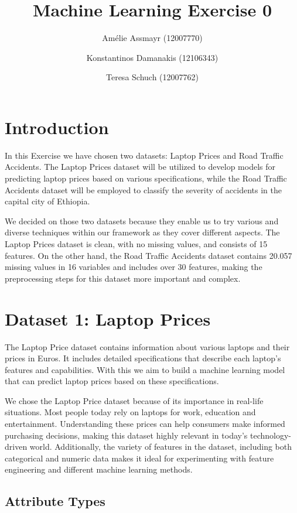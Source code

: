 \documentclass{article}
\title{Machine Learning Exercise 0}
\author{Amélie Assmayr (12007770) \and
        Konstantinos Damanakis (12106343) \and
        Teresa Schuch (12007762)}
\begin{document}
\maketitle

\section{Introduction}

In this Exercise we have chosen two datasets: Laptop Prices and Road Traffic Accidents. The Laptop Prices dataset will be utilized to develop models for predicting laptop prices based on various specifications, while the Road Traffic Accidents dataset will be employed to classify the severity of accidents in the capital city of Ethiopia. \newline

We decided on those two datasets because they enable us to try various and diverse techniques within our framework as they cover different aspects. The Laptop Prices dataset is clean, with no missing values, and consists of 15 features. On the other hand, the Road Traffic Accidents dataset contains 20.057 missing values in 16 variables and includes over 30 features, making the preprocessing steps for this dataset more important and complex.

\section{Dataset 1: Laptop Prices}

The Laptop Price dataset contains information about various laptops and their prices in Euros. It includes detailed specifications that describe each laptop's features and capabilities. With this we aim to build a machine learning model that can predict laptop prices based on these specifications. \newline

We chose the Laptop Price dataset because of its importance in real-life situations. Most people today rely on laptops for work, education and entertainment. Understanding these prices can help consumers make informed purchasing decisions, making this dataset highly relevant in today’s technology-driven world. Additionally, the variety of features in the dataset, including both categorical and numeric data makes it ideal for experimenting with feature engineering and different machine learning methods.

\subsection{Attribute Types}
\end{document}
